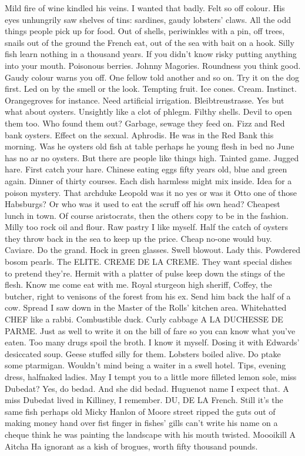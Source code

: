 Mild fire of wine kindled his veins.
I wanted that badly.
Felt so off
colour.
His eyes unhungrily saw shelves of tins:
sardines,
gaudy
lobsters' claws.
All the odd things people pick up for food.
Out of
shells,
periwinkles with a pin,
off trees,
snails out of the ground the
French eat,
out of the sea with bait on a hook.
Silly fish learn nothing
in a thousand years.
If you didn't know risky putting anything into your
mouth.
Poisonous berries.
Johnny Magories.
Roundness you think good.
Gaudy colour warns you off.
One fellow told another and so on.
Try it on
the dog first.
Led on by the smell or the look.
Tempting fruit.
Ice
cones.
Cream.
Instinct.
Orangegroves for instance.
Need artificial
irrigation.
Bleibtreustrasse.
Yes but what about oysters.
Unsightly like
a clot of phlegm.
Filthy shells.
Devil to open them too.
Who found them
out?
Garbage,
sewage they feed on.
Fizz and Red bank oysters.
Effect on
the sexual.
Aphrodis.
He was in the Red Bank this morning.
Was he oysters
old fish at table perhaps he young flesh in bed no June has no ar no
oysters.
But there are people like things high.
Tainted game.
Jugged
hare.
First catch your hare.
Chinese eating eggs fifty years old,
blue
and green again.
Dinner of thirty courses.
Each dish harmless might mix
inside.
Idea for a poison mystery.
That archduke Leopold was it no yes or
was it Otto one of those Habsburgs?
Or who was it used to eat the scruff
off his own head?
Cheapest lunch in town.
Of course aristocrats,
then the
others copy to be in the fashion.
Milly too rock oil and flour.
Raw
pastry I like myself.
Half the catch of oysters they throw back in the
sea to keep up the price.
Cheap no-one would buy.
Caviare.
Do the grand.
Hock in green glasses.
Swell blowout.
Lady this.
Powdered bosom pearls.
The ELITE.
CREME DE LA CREME.
They want special dishes to pretend
they're.
Hermit with a platter of pulse keep down the stings of the
flesh.
Know me come eat with me.
Royal sturgeon high sheriff,
Coffey,
the
butcher,
right to venisons of the forest from his ex.
Send him back the
half of a cow.
Spread I saw down in the Master of the Rolls' kitchen
area.
Whitehatted CHEF like a rabbi.
Combustible duck.
Curly cabbage A LA
DUCHESSE DE PARME.
Just as well to write it on the bill of fare so you
can know what you've eaten.
Too many drugs spoil the broth.
I know it
myself.
Dosing it with Edwards' desiccated soup.
Geese stuffed silly for
them.
Lobsters boiled alive.
Do ptake some ptarmigan.
Wouldn't mind being
a waiter in a swell hotel.
Tips,
evening dress,
halfnaked ladies.
May I
tempt you to a little more filleted lemon sole,
miss Dubedat?
Yes,
do
bedad.
And she did bedad.
Huguenot name I expect that.
A miss Dubedat
lived in Killiney,
I remember.
DU,
DE LA French.
Still it's the same fish
perhaps old Micky Hanlon of Moore street ripped the guts out of making
money hand over fist finger in fishes' gills can't write his name on a
cheque think he was painting the landscape with his mouth twisted.
Moooikill A Aitcha Ha ignorant as a kish of brogues,
worth fifty thousand
pounds.


